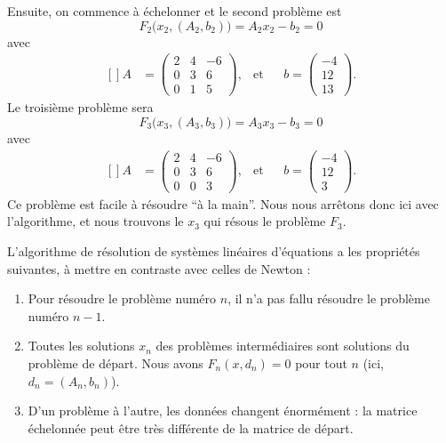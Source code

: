Ensuite, on commence à échelonner et le second problème est
\begin{equation}
	F_2\big(x_2,(A_2,b_2)\big)=A_2x_2-b_2=0
\end{equation}
avec
\begin{equation}
	\begin{aligned}[]
		A&=\begin{pmatrix}
			2   &   4   &   -6  \\
			0   &   3   &   6   \\
			0   &   1   &   5
		\end{pmatrix}, &\text{et}&&b=\begin{pmatrix}
			-4  \\
			12  \\
			13
		\end{pmatrix}.
	\end{aligned}
\end{equation}
Le troisième problème sera
\begin{equation}
	F_3\big(x_3,(A_3,b_3)\big)=A_3x_3-b_3=0
\end{equation}
avec
\begin{equation}
	\begin{aligned}[]
		A&=\begin{pmatrix}
			2   &   4   &   -6  \\
			0   &   3   &   6   \\
			0   &   0   &   3
		\end{pmatrix}, &\text{et}&&b=\begin{pmatrix}
			-4  \\
			12  \\
			3
		\end{pmatrix}.
	\end{aligned}
\end{equation}
Ce problème est facile à résoudre ``à la main''. Nous nous arrêtons donc ici avec l'algorithme, et nous trouvons le $x_3$ qui résous le problème $F_3$.

L'algorithme de résolution de systèmes linéaires d'équations a les propriétés suivantes, à mettre en contraste avec celles de Newton :
\begin{enumerate}

	\item
		Pour résoudre le problème numéro $n$, il n'a pas fallu résoudre le problème numéro $n-1$.
	\item
		Toutes les solutions $x_n$ des problèmes intermédiaires sont solutions du problème de départ. Nous avons $F_n(x,d_n)=0$ pour tout $n$ (ici, $d_n=(A_n,b_n)$).
	\item
		D'un problème à l'autre, les données changent énormément : la matrice échelonnée peut être très différente de la matrice de départ.

\end{enumerate}


